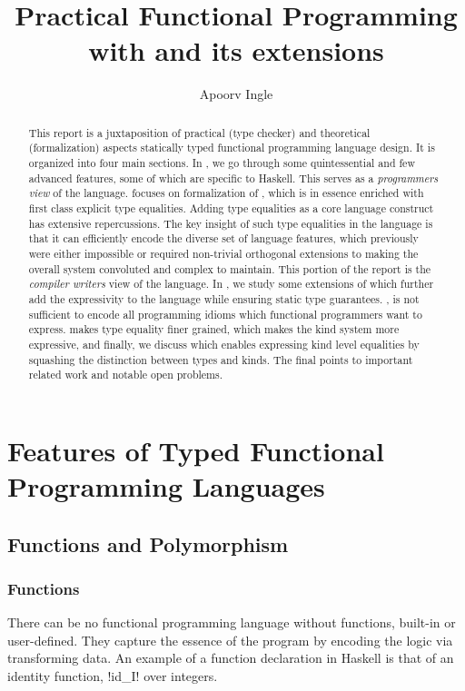 \documentclass[manuscript,screen,nonacm]{acmart}
\title{Practical Functional Programming with \SFC and its extensions}
\author{Apoorv Ingle}
\affiliation{%
  \institution{University of Iowa} \department{Department of Computer Science} \streetaddress{McLean Hall} \city{Iowa City} \state{Iowa} \country{USA}}
\begin{document}
\begin{abstract}
This report is a juxtaposition of practical (type checker) and theoretical (formalization) aspects statically typed functional programming language design. It is organized into four main sections. In , we go through some quintessential and few advanced features, some of which are specific to Haskell. This serves as a \emph{programmers view} of the language.  focuses on formalization of \SFC, which is in essence \SF enriched with first class explicit type equalities. Adding type equalities as a core language construct has extensive repercussions. The key insight of such type equalities in the language is that it can efficiently encode the diverse set of language features, which previously were either impossible or required non-trivial orthogonal extensions to \SF making the overall system convoluted and complex to maintain. This portion of the report is the \emph{compiler writers} view of the language. In , we study some extensions of \SFC which further add the expressivity to the language while ensuring static type guarantees. \SFC, is not sufficient to encode all programming idioms which functional programmers want to express. \SFR makes type equality finer grained, \SFP which makes the kind system more expressive, and finally, we discuss \SFK which enables expressing kind level equalities by squashing the distinction between types and kinds. The final  points to important related work and notable open problems.
\end{abstract}

\maketitle
\section{Features of Typed Functional Programming Languages}\label{sec:language-features}
\subsection{Functions and Polymorphism}
\subsubsection{Functions}
There can be no functional programming language without functions, built-in or user-defined. They capture the essence of the program by encoding the logic via transforming data. An example of a function declaration in Haskell is that of an identity function, !id_I! over integers.
\end{document}
